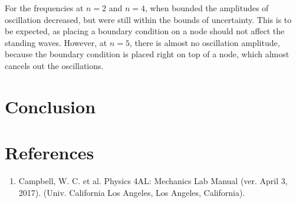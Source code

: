 \documentclass[11pt]{report}
\begin{document}
For the frequencies at $n=2$ and $n=4$, when bounded the amplitudes of
oscillation decreased, but were still within the bounds of uncertainty.  This is
to be expected, as placing a boundary condition on a node should not affect the
standing waves.  However, at $n=5$, there is almost no oscillation amplitude,
because the boundary condition is placed right on top of a node, which almost
cancels out the oscillations.

\section*{Conclusion}

\section*{References}
\begin{enumerate}
    \item Campbell, W. C. et al. Physics 4AL: Mechanics Lab Manual (ver. April
        3, 2017). (Univ. California Los Angeles, Los Angeles, California).
\end{enumerate}
\end{document}
